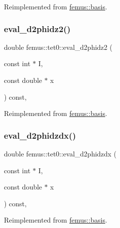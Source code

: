 Reimplemented from \mbox{\hyperlink{classfemus_1_1basis_ab9e060e9c9e763d8c10fdffcc5e0b774}{femus\+::basis}}.

\mbox{\label{classfemus_1_1tet0_a8ce29003823d07fa76934c881b99aa40}} 
\subsubsection{\texorpdfstring{eval\+\_\+d2phidz2()}{eval\_d2phidz2()}}
{\footnotesize\ttfamily double femus\+::tet0\+::eval\+\_\+d2phidz2 (\begin{DoxyParamCaption}\item[{const int $\ast$}]{I,  }\item[{const double $\ast$}]{x }\end{DoxyParamCaption}) const\hspace{0.3cm}{\ttfamily [inline]}, {\ttfamily [virtual]}}



Reimplemented from \mbox{\hyperlink{classfemus_1_1basis_a9d32da05f49ba2c989fec04fb7836c39}{femus\+::basis}}.

\mbox{\label{classfemus_1_1tet0_ab082238423f56a4a4810554511f5feb1}} 
\subsubsection{\texorpdfstring{eval\+\_\+d2phidzdx()}{eval\_d2phidzdx()}}
{\footnotesize\ttfamily double femus\+::tet0\+::eval\+\_\+d2phidzdx (\begin{DoxyParamCaption}\item[{const int $\ast$}]{I,  }\item[{const double $\ast$}]{x }\end{DoxyParamCaption}) const\hspace{0.3cm}{\ttfamily [inline]}, {\ttfamily [virtual]}}



Reimplemented from \mbox{\hyperlink{classfemus_1_1basis_a5d619ec5bd57b7d2dc34a99d69975c77}{femus\+::basis}}.

\mbox{\label{classfemus_1_1tet0_a5ebdbcdd7bcb5ef07e07b7952d2a34d0}} 
